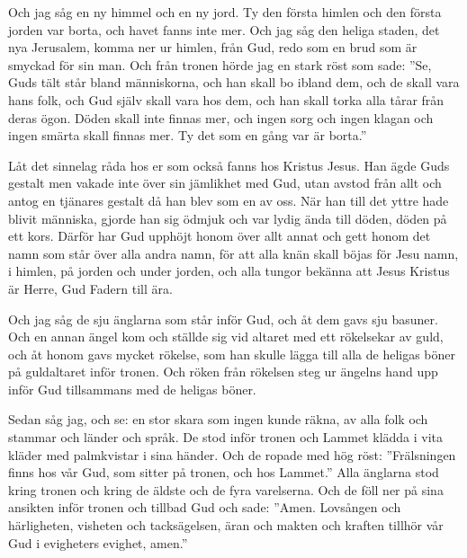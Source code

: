 {
Och jag såg en ny himmel och en ny jord. Ty den första himlen och den första jorden var borta, och havet fanns inte mer. 
Och jag såg den heliga staden, det nya Jerusalem, komma ner ur himlen, från Gud, redo som en brud som är smyckad för sin man. 
Och från tronen hörde jag en stark röst som sade: ”Se, Guds tält står bland människorna, och han skall bo ibland dem, och de skall vara hans folk, och Gud själv skall vara hos dem, 
och han skall torka alla tårar från deras ögon. Döden skall inte finnas mer, och ingen sorg och ingen klagan och ingen smärta skall finnas mer. Ty det som en gång var är borta.” }


{Låt det sinnelag råda hos er som också fanns hos Kristus Jesus. 
Han ägde Guds gestalt men vakade inte över sin jämlikhet med Gud, 
utan avstod från allt och antog en tjänares gestalt då han blev som en av oss. När han till det yttre hade blivit människa, gjorde han sig ödmjuk och var lydig ända till döden, döden på ett kors. 
Därför har Gud upphöjt honom över allt annat och gett honom det namn som står över alla andra namn, för att alla knän skall böjas för Jesu namn, i himlen, på jorden och under jorden, och alla tungor bekänna att Jesus Kristus är Herre, Gud Fadern till ära.}



{
Och jag såg de sju änglarna som står inför Gud, och åt dem gavs sju basuner.
Och en annan ängel kom och ställde sig vid altaret med ett rökelsekar av guld, och åt honom gavs mycket rökelse, som han skulle lägga till alla de heligas böner på guldaltaret inför tronen.
Och röken från rökelsen steg ur ängelns hand upp inför Gud tillsammans med de heligas böner.}


{Sedan såg jag, och se: en stor skara som ingen kunde räkna, av alla folk och stammar och länder och språk. De stod inför tronen och Lammet klädda i vita kläder med palmkvistar i sina händer.
Och de ropade med hög röst: ”Frälsningen finns hos vår Gud, som sitter på tronen, och hos Lammet.”
Alla änglarna stod kring tronen och kring de äldste och de fyra varelserna. Och de föll ner på sina ansikten inför tronen och tillbad Gud
och sade: ”Amen. Lovsången och härligheten, visheten och tacksägelsen, äran och makten och kraften tillhör vår Gud i evigheters evighet, amen.”}


